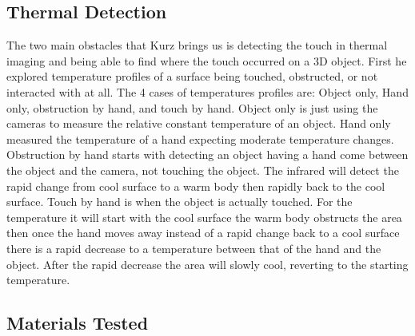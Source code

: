 \documentclass{sig-alternate}
\begin{document}
\subsection{Thermal Detection}
\label{Thermal Detection}
The two main obstacles that Kurz brings us is detecting the touch in thermal imaging and being able to find where the touch occurred on a 3D object. First he explored temperature profiles of a surface being touched, obstructed, or not interacted with at all. The 4 cases of temperatures profiles are: Object only, Hand only, obstruction by hand, and touch by hand. Object only is just using the cameras to measure the relative constant temperature of an object. Hand only measured the temperature of a hand expecting moderate temperature changes. Obstruction by hand starts with detecting an object having a hand come between the object and the camera, not touching the object. The infrared will detect the rapid change from cool surface to a warm body then rapidly back to the cool surface. Touch by hand is when the object is actually touched. For the temperature it will start with the cool surface the warm body obstructs the area then once the hand moves away instead of a rapid change back to a cool surface there is a rapid decrease to a temperature between that of the hand and the object. After the rapid decrease the area will slowly cool, reverting to the starting temperature.


\subsection{Materials Tested}
\label{Materials Tested}
\end{document}
